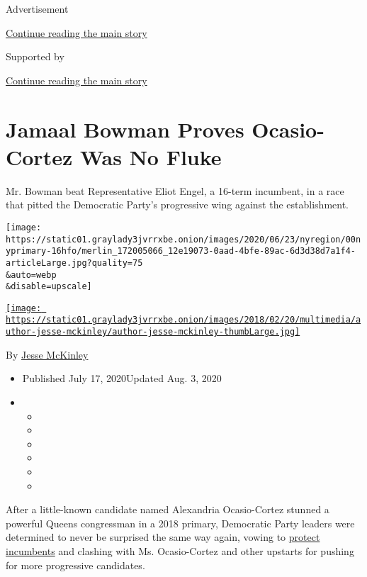 Advertisement

\protect\hyperlink{after-top}{Continue reading the main story}

Supported by

\protect\hyperlink{after-sponsor}{Continue reading the main story}

\hypertarget{jamaal-bowman-proves-ocasio-cortez-was-no-fluke}{%
\section{Jamaal Bowman Proves Ocasio-Cortez Was No
Fluke}\label{jamaal-bowman-proves-ocasio-cortez-was-no-fluke}}

Mr. Bowman beat Representative Eliot Engel, a 16-term incumbent, in a
race that pitted the Democratic Party's progressive wing against the
establishment.

\texttt{[image: https://static01.graylady3jvrrxbe.onion/images/2020/06/23/nyregion/00nyprimary-16hfo/merlin\_172005066\_12e19073-0aad-4bfe-89ac-6d3d38d7a1f4-articleLarge.jpg?quality=75\\\&auto=webp\\\&disable=upscale]}

\href{https://www.nytimes3xbfgragh.onion/by/jesse-mckinley}{\texttt{[image: https://static01.graylady3jvrrxbe.onion/images/2018/02/20/multimedia/author-jesse-mckinley/author-jesse-mckinley-thumbLarge.jpg]}}

By \href{https://www.nytimes3xbfgragh.onion/by/jesse-mckinley}{Jesse
McKinley}

\begin{itemize}
\item
  Published July 17, 2020Updated Aug. 3, 2020
\item
  \begin{itemize}
  \item
  \item
  \item
  \item
  \item
  \item
  \end{itemize}
\end{itemize}

After a little-known candidate named Alexandria Ocasio-Cortez stunned a
powerful Queens congressman in a 2018 primary, Democratic Party leaders
were determined to never be surprised the same way again, vowing to
\href{https://thehill.com/homenews/campaign/435332-dems-seek-to-stifle-primary-challenges-to-incumbents}{protect
incumbents} and clashing with Ms. Ocasio-Cortez and other upstarts for
pushing for more progressive candidates.

